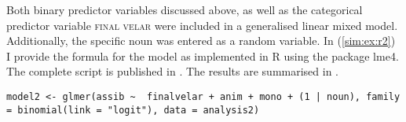 \documentclass[output=paper,colorlinks,citecolor=brown]{langscibook}
\begin{document}

Both binary predictor variables discussed above, as well as the categorical predictor variable \textsc{final velar} were included in a generalised linear mixed model. Additionally, the specific noun was entered as a random variable. In (\ref{sim:ex:r2})
 I provide the formula for the model as implemented in R using the package lme4. The complete script is published in 
\citet{Simonovic2024}. The results  are summarised in . 

\ea \texttt{model2 <- glmer(assib \textasciitilde { } finalvelar + anim + mono + (1 | noun), family = binomial(link = "logit"), data = analysis2)}
\label{sim:ex:r2}
\z


\begin{table}
\caption{Generalised linear mixed model results}
\label{sim:tab:results2}
\end{table}
\end{document}
